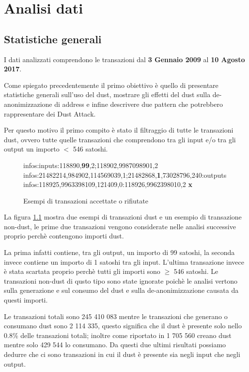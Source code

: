 \chapter{Analisi dati}
\section{Statistiche generali}
I dati analizzati comprendono le transazioni dal \textbf{3 Gennaio 2009} al \textbf{10 Agosto 2017}.

Come spiegato precedentemente il primo obiettivo è quello di presentare statistiche generali sull'uso del dust, mostrare gli effetti del dust sulla de-anonimizzazione di address e infine descrivere due pattern che potrebbero rappresentare dei Dust Attack.

Per questo motivo il primo compito è stato il filtraggio di tutte le transazioni dust, ovvero tutte quelle transazioni che comprendono tra gli input e/o tra gli output un importo $<$ 546 satoshi.
\begin{figure}[H]
\begin{mdframed}
 infos:inputs:118890,\textbf{99},2;118902,9987098901,2 \checkmark\\
 infos:21482214,984902,114569039,1;21482868,\textbf{1},73028796,240:outputs \checkmark\\
 infos:118925,9963398109,121409,0:118926,9962398010,2 \textbf{x}
\end{mdframed}
\caption{Esempi di transazioni accettate o rifiutate}
\label{tx_dust}
\end{figure}
\Floatbarrier
La figura \ref{tx_dust} mostra due esempi di transazioni dust e un esempio di transazione non-dust, le prime due transazioni vengono considerate nelle analisi successive proprio perchè contengono importi dust. 

La prima infatti contiene, tra gli output, un importo di 99 satoshi, la seconda invece contiene un importo di 1 satoshi tra gli input. L'ultima transazione invece è stata scartata proprio perchè tutti gli importi sono $\ge$ 546 satoshi. Le transazioni non-dust di qusto tipo sono state ignorate poichè le analisi vertono sulla generazione e sul consumo del dust e sulla de-anonimizzazione causata da questi importi.

Le transazioni totali sono 245 410 083 mentre le transazioni che generano o consumano dust sono  2 114 335, questo significa che il dust è presente solo nello 0.8\% delle transazioni totali; inoltre come riportato in \cite{dustAnalisi} 1 705 560 creano dust mentre solo 429 544 lo consumano. Da questi due ultimi risultati possiamo dedurre che ci sono transazioni in cui il dust è presente sia negli input che negli output.

